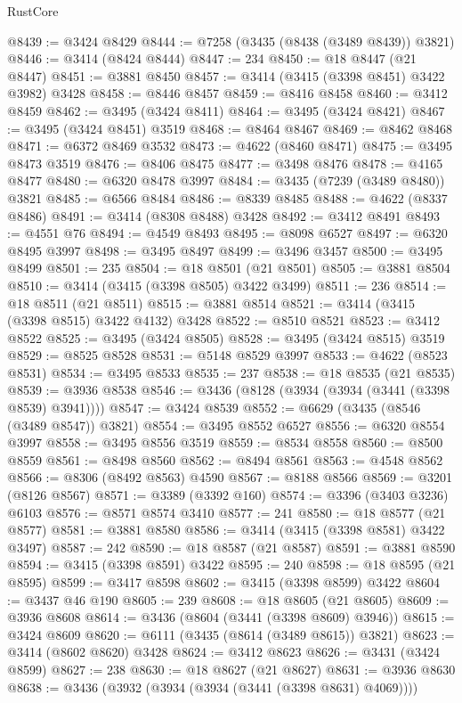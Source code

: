 \begin{lexlean}{RustCore}
\begin{coremodule}
@8439 := @3424 @8429
@8444 := @7258 (@3435 (@8438 (@3489 @8439)) @3821)
@8446 := @3414 (@8424 @8444)
@8447 := 234
@8450 := @18 @8447 (@21 @8447)
@8451 := @3881 @8450
@8457 := @3414 (@3415 (@3398 @8451) @3422 @3982) @3428
@8458 := @8446 @8457
@8459 := @8416 @8458
@8460 := @3412 @8459
@8462 := @3495 (@3424 @8411)
@8464 := @3495 (@3424 @8421)
@8467 := @3495 (@3424 @8451) @3519
@8468 := @8464 @8467
@8469 := @8462 @8468
@8471 := @6372 @8469 @3532
@8473 := @4622 (@8460 @8471)
@8475 := @3495 @8473 @3519
@8476 := @8406 @8475
@8477 := @3498 @8476
@8478 := @4165 @8477
@8480 := @6320 @8478 @3997
@8484 := @3435 (@7239 (@3489 @8480)) @3821
@8485 := @6566 @8484
@8486 := @8339 @8485
@8488 := @4622 (@8337 @8486)
@8491 := @3414 (@8308 @8488) @3428
@8492 := @3412 @8491
@8493 := @4551 @76
@8494 := @4549 @8493
@8495 := @8098 @6527
@8497 := @6320 @8495 @3997
@8498 := @3495 @8497
@8499 := @3496 @3457
@8500 := @3495 @8499
@8501 := 235
@8504 := @18 @8501 (@21 @8501)
@8505 := @3881 @8504
@8510 := @3414 (@3415 (@3398 @8505) @3422 @3499)
@8511 := 236
@8514 := @18 @8511 (@21 @8511)
@8515 := @3881 @8514
@8521 := @3414 (@3415 (@3398 @8515) @3422 @4132) @3428
@8522 := @8510 @8521
@8523 := @3412 @8522
@8525 := @3495 (@3424 @8505)
@8528 := @3495 (@3424 @8515) @3519
@8529 := @8525 @8528
@8531 := @5148 @8529 @3997
@8533 := @4622 (@8523 @8531)
@8534 := @3495 @8533
@8535 := 237
@8538 := @18 @8535 (@21 @8535)
@8539 := @3936 @8538
@8546 := @3436 (@8128 (@3934 (@3934 (@3441 (@3398 @8539) @3941))))
@8547 := @3424 @8539
@8552 := @6629 (@3435 (@8546 (@3489 @8547)) @3821)
@8554 := @3495 @8552 @6527
@8556 := @6320 @8554 @3997
@8558 := @3495 @8556 @3519
@8559 := @8534 @8558
@8560 := @8500 @8559
@8561 := @8498 @8560
@8562 := @8494 @8561
@8563 := @4548 @8562
@8566 := @8306 (@8492 @8563) @4590
@8567 := @8188 @8566
@8569 := @3201 (@8126 @8567)
@8571 := @3389 (@3392 @160)
@8574 := @3396 (@3403 @3236) @6103
@8576 := @8571 @8574 @3410
@8577 := 241
@8580 := @18 @8577 (@21 @8577)
@8581 := @3881 @8580
@8586 := @3414 (@3415 (@3398 @8581) @3422 @3497)
@8587 := 242
@8590 := @18 @8587 (@21 @8587)
@8591 := @3881 @8590
@8594 := @3415 (@3398 @8591) @3422
@8595 := 240
@8598 := @18 @8595 (@21 @8595)
@8599 := @3417 @8598
@8602 := @3415 (@3398 @8599) @3422
@8604 := @3437 @46 @190
@8605 := 239
@8608 := @18 @8605 (@21 @8605)
@8609 := @3936 @8608
@8614 := @3436 (@8604 (@3441 (@3398 @8609) @3946))
@8615 := @3424 @8609
@8620 := @6111 (@3435 (@8614 (@3489 @8615)) @3821)
@8623 := @3414 (@8602 @8620) @3428
@8624 := @3412 @8623
@8626 := @3431 (@3424 @8599)
@8627 := 238
@8630 := @18 @8627 (@21 @8627)
@8631 := @3936 @8630
@8638 := @3436 (@3932 (@3934 (@3934 (@3441 (@3398 @8631) @4069))))

\end{coremodule}
\end{lexlean}
